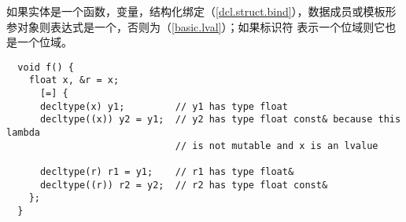 如果实体是一个函数，变量，结构化绑定（\ref{dcl.struct.bind}），数据成员或模板形
参对象则表达式是一个\lvalue{}，否则为\prvalue{}（\ref{basic.lval}）；如果标识符
表示一个位域则它也是一个位域。

\begin{example}
  \begin{lstlisting}
  void f() {
    float x, &r = x;
      [=] {
      decltype(x) y1;         // y1 has type float
      decltype((x)) y2 = y1;  // y2 has type float const& because this lambda
                              // is not mutable and x is an lvalue

      decltype(r) r1 = y1;    // r1 has type float&
      decltype((r)) r2 = y2;  // r2 has type float const&
    };
  }
  \end{lstlisting}
\end{example}

